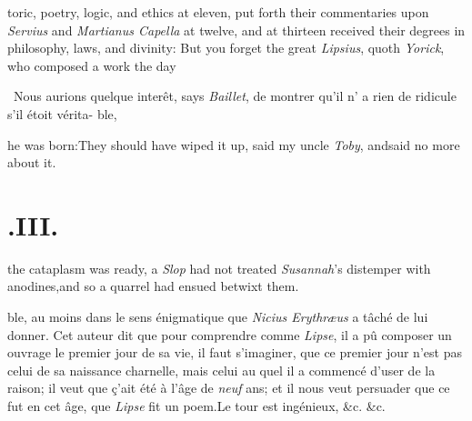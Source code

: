 \documentclass{article}
\begin{document}
toric, poetry, logic, and ethics at eleven,\break
\tsk put forth their commentaries upon\break
\textit{Servius} and \textit{Martianus Capella} at twelve,\break
\tsk and at thirteen received their degrees in
philosophy, laws, and divinity:\tsh\break
But you forget the great \textit{Lipsius}, quoth
\textit{Yorick}, who composed a work \lower -2pt\hbox{\ast} the day\break
{}

\vfill
\bgroup\footnotesize
\indent\fnast\ Nous aurions quelque interêt, says
\textit{Baillet}, de montrer qu’il n’ a rien de ridicule s’il étoit vérita-
\break\null\hfill ble,\par\egroup

\eject\noindent
he was born:\tsh They should have wiped it up, said my uncle
\textit{Toby}, and\break said no more about it.

\section{.\enspace III.}

 the cataplasm was ready, a\break
{}
\textit{Slop} had not treated
\textit{Susannah}’s distemper with anodines\sic,\tsk and so a
quarrel had ensued betwixt them.

\vfill
\bgroup\footnotesize
\noindent
ble, au
moins dans le sens énigmatique que \textit{Nicius Erythræus} a tâché de lui donner.
Cet auteur dit que pour comprendre comme \textit{Lipse}, il a pû composer un ouvrage
le premier jour de sa vie, il faut s’imaginer, que ce premier jour n’est pas celui
de sa naissance charnelle, mais celui au quel il a commencé d’user de la raison; il
veut que ç’ait été à l’âge de \textit{neuf} ans; et il nous veut persuader que ce
fut en cet âge, que \textit{Lipse} fit un poem.\tsh Le tour est ingénieux, \&c.
\&c.\par\egroup
{}
\eject
\end{document}
